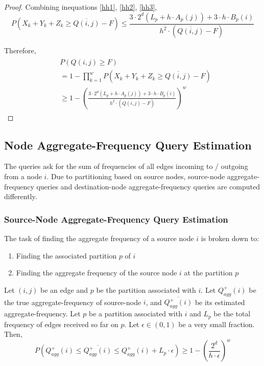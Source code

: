 \begin{proof}
Combining inequations \ref{hh1}, \ref{hh2}, \ref{hh3},
\begin{equation}
  P(X_k + Y_k + Z_k \geq \overline{Q(i,j)}-F) \leq \frac{3\cdot2^d(L_p+h\cdot A_p(j)) + 3\cdot h\cdot B_p(i)}{h^2\cdot (\overline{Q(i,j)}-F)}
\end{equation}

Therefore,
\begin{align}
\begin{split}
&  P(Q(i,j) \geq F)
\\  &= 1 - \prod _{k=1}^{w}P(X_k + Y_k + Z_k \geq \overline{Q(i,j)}-F)
\\  &\geq 1-(\frac{3\cdot2^d(L_p+h\cdot A_p(j)) + 3\cdot h\cdot B_p(i)}{h^2\cdot (\overline{Q(i,j)}-F)})^w
\end{split}
\end{align}

\end{proof}

\subsection{Node Aggregate-Frequency Query Estimation}

The queries ask for the sum of frequencies of all edges incoming to / outgoing from a node $i$. Due to partitioning based on source nodes, source-node aggregate-frequency queries and destination-node aggregate-frequency queries are computed differently.

\subsubsection{Source-Node Aggregate-Frequency Query Estimation}

The task of finding the aggregate frequency of a source node $i$ is broken down to:

\begin{enumerate}
\item Finding the associated partition $p$ of $i$
\item Finding the aggregate frequency of the source node $i$ at the partition $p$
\end{enumerate}


\begin{theorem}
\label{thm:agg1}
Let $(i,j)$ be an edge and $p$ be the partition associated with $i$. Let $Q_{agg}^{+}(i)$ be the true aggregate-frequency of source-node $i$, and $\overline{Q_{agg}^{+}(i)}$ be its estimated aggregate-frequency. Let $p$ be a partition associated with $i$ and $L_p$ be the total frequency of edges received so far on $p$. Let $\epsilon \in (0,1)$ be a very small fraction. Then,
\[
P(Q_{agg}^{+}(i) \leq \overline{Q_{agg}^{+}(i)} \leq Q_{agg}^{+}(i) + L_p \cdot \epsilon) \geq 1-(\frac{2^d}{h\cdot\epsilon})^w
\]
\end{theorem}

